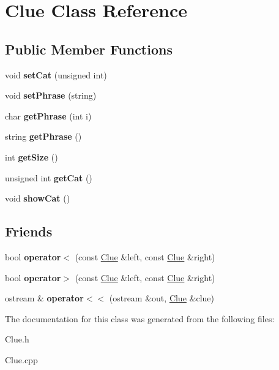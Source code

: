 \hypertarget{class_clue}{}\section{Clue Class Reference}
\label{class_clue}
\subsection*{Public Member Functions}
\begin{DoxyCompactItemize}
\item 
\hypertarget{class_clue_a5b4f0e5acadc421e342ba051ddd44f31}{}\label{class_clue_a5b4f0e5acadc421e342ba051ddd44f31} 
void {\bfseries set\+Cat} (unsigned int)
\item 
\hypertarget{class_clue_a6218cef7fc152cdda791e017f53ff2ce}{}\label{class_clue_a6218cef7fc152cdda791e017f53ff2ce} 
void {\bfseries set\+Phrase} (string)
\item 
\hypertarget{class_clue_a4026c0a49ed3fe8f51ccc739ed4c12a7}{}\label{class_clue_a4026c0a49ed3fe8f51ccc739ed4c12a7} 
char {\bfseries get\+Phrase} (int i)
\item 
\hypertarget{class_clue_aa18d42b972b537b55f24bb86a6ba3357}{}\label{class_clue_aa18d42b972b537b55f24bb86a6ba3357} 
string {\bfseries get\+Phrase} ()
\item 
\hypertarget{class_clue_aaef3a4bee9939abf3644d4215c3d507d}{}\label{class_clue_aaef3a4bee9939abf3644d4215c3d507d} 
int {\bfseries get\+Size} ()
\item 
\hypertarget{class_clue_a5c5cafb42d24f72f81dadf29f95d2b26}{}\label{class_clue_a5c5cafb42d24f72f81dadf29f95d2b26} 
unsigned int {\bfseries get\+Cat} ()
\item 
\hypertarget{class_clue_ae330074934125b8033619fd1b225af89}{}\label{class_clue_ae330074934125b8033619fd1b225af89} 
void {\bfseries show\+Cat} ()
\end{DoxyCompactItemize}
\subsection*{Friends}
\begin{DoxyCompactItemize}
\item 
\hypertarget{class_clue_a05f44ea52d66ad961f0da85b56a75311}{}\label{class_clue_a05f44ea52d66ad961f0da85b56a75311} 
bool {\bfseries operator$<$} (const \hyperlink{class_clue}{Clue} \&left, const \hyperlink{class_clue}{Clue} \&right)
\item 
\hypertarget{class_clue_a17d50bc157cf27d75f5c98a7e49b803a}{}\label{class_clue_a17d50bc157cf27d75f5c98a7e49b803a} 
bool {\bfseries operator$>$} (const \hyperlink{class_clue}{Clue} \&left, const \hyperlink{class_clue}{Clue} \&right)
\item 
\hypertarget{class_clue_a419e0fece887b05a0190a02f56d118dd}{}\label{class_clue_a419e0fece887b05a0190a02f56d118dd} 
ostream \& {\bfseries operator$<$$<$} (ostream \&out, \hyperlink{class_clue}{Clue} \&clue)
\end{DoxyCompactItemize}


The documentation for this class was generated from the following files\+:\begin{DoxyCompactItemize}
\item 
Clue.\+h\item 
Clue.\+cpp\end{DoxyCompactItemize}
